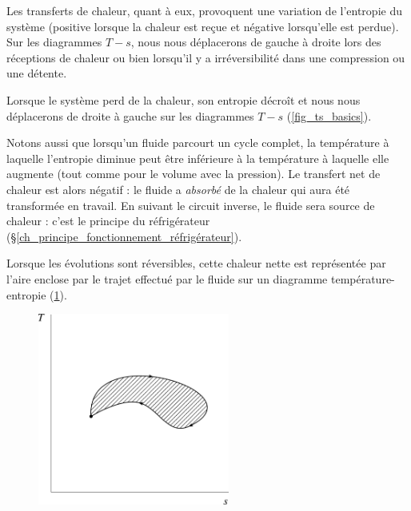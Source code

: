 		Les transferts de chaleur, quant à eux, provoquent une variation de l’entropie du système (positive lorsque la chaleur est reçue et négative lorsqu’elle est perdue). Sur les diagrammes $T-s$, nous nous déplacerons de gauche à droite lors des réceptions de chaleur ou bien lorsqu’il y a irréversibilité dans une compression ou une détente.

		Lorsque le système perd de la chaleur, son entropie décroît et nous nous déplacerons de droite à gauche sur les diagrammes $T-s$ (\cref{fig_ts_basics}).

		\clearfloats{}
		Notons aussi que lorsqu’un fluide parcourt un cycle complet, la température à laquelle l’entropie diminue peut être inférieure à la température à laquelle elle augmente (tout comme pour le volume avec la pression). Le transfert net de chaleur est alors négatif : le fluide a \emph{absorbé} de la chaleur qui aura été transformée en travail. En suivant le circuit inverse, le fluide sera source de chaleur : c’est le principe du réfrigérateur (\S\ref{ch_principe_fonctionnement_réfrigérateur}).
		
		Lorsque les évolutions sont réversibles, cette chaleur nette est représentée par l’aire enclose par le trajet effectué par le fluide sur un diagramme température-entropie (\cref{fig_ts_cycle}).

		\begin{figure}
			\begin{center}
				\includegraphics[width=6.3cm]{images/ts_cycle.png}
			\end{center}
			\label{fig_ts_cycle}
		\end{figure}

